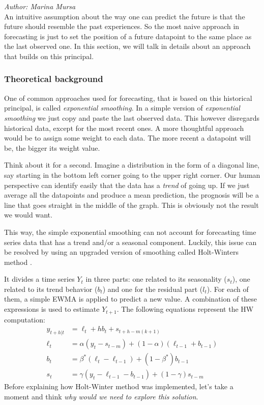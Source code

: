 \textit{Author: Marina Mursa} \\
\label{sec:holt-winter}
An intuitive assumption about the way one can predict the future is that the future should resemble the past experiences. So the most naive approach in forecasting is just to set the position of a future datapoint to the same place as the last observed one. In this section, we will talk in details about an approach that builds on this principal. \\
\subsubsection{Theoretical background}
One of common approaches used for forecasting, that is based on this historical principal, is called \textit{exponential smoothing}. In a simple version of \textit{exponential smoothing} we just copy and paste the last observed data. This however disregards historical data, except for the most recent ones. A more thoughtful approach would be to assign some weight to each data. The more recent a datapoint will be, the bigger its weight value. 

Think about it for a second. Imagine a distribution in the form of a diagonal line, say starting in the bottom left corner going to the upper right corner. Our human perspective can identify easily that the data has a \textit{trend} of going up. If we just average all the datapoints and produce a mean prediction, the prognosis will be a line that goes straight in the middle of the graph. This is obviously not the result we would want.

This way, the simple exponential smoothing can not account for forecasting time series data that has a trend and/or a seasonal component. Luckily, this issue can be resolved by using an upgraded version of smoothing called Holt-Winters method \cite{holt}. 

It divides a time series $Y_{t}$ in three parts: one related to its seasonality ($s_{t}$), one related to its  trend behavior ($b_{t}$) and one for  the residual part ($l_{t}$). For each  of them, a simple EWMA is  applied  to predict a new value.  A  combination  of  these  expressions  is used  to  estimate  $Y_{t+1}$. The following equations represent the HW computation: 
\begin{align*}
  \hat{y}_{t+h|t} &= \ell_{t} + hb_{t} + s_{t+h-m(k+1)} \\
  \ell_{t} &= \alpha(y_{t} - s_{t-m}) + (1 - \alpha)(\ell_{t-1} + b_{t-1})\\
  b_{t} &= \beta^*(\ell_{t} - \ell_{t-1}) + (1 - \beta^*)b_{t-1}\\
  s_{t} &= \gamma (y_{t}-\ell_{t-1}-b_{t-1}) + (1-\gamma)s_{t-m}
\end{align*}
Before explaining how Holt-Winter method was implemented, let's take a moment and think \textit{why would we need to explore this solution}.

